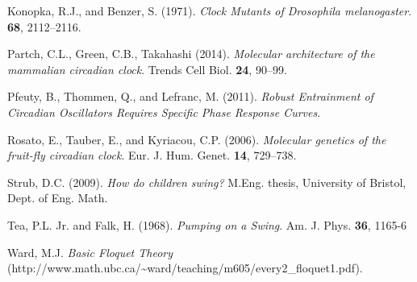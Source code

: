 \documentclass[11pt,letter, english,%
]{article}
\begin{document}
\bigskip\noindent
Konopka, R.J., and Benzer, S. (1971). \textit{Clock Mutants of Drosophila
melanogaster}. \textbf{68}, 2112–2116.

\bigskip\noindent
Partch, C.L., Green, C.B., Takahashi (2014).
\textit{Molecular architecture of the mammalian circadian clock}. Trends Cell
Biol. \textbf{24}, 90–99.

\bigskip\noindent
Pfeuty, B., Thommen, Q., and Lefranc, M. (2011). \textit{Robust Entrainment of
Circadian Oscillators Requires Specific Phase Response Curves}.

\bigskip\noindent
Rosato, E., Tauber, E., and Kyriacou, C.P. (2006). \textit{Molecular genetics
of the fruit-fly circadian clock}. Eur. J. Hum. Genet. \textbf{14},
729–738.

\bigskip\noindent
Strub, D.C. (2009). \textit{How do children swing?}  M.Eng. thesis, University
of Bristol, Dept. of Eng. Math.%

\bigskip\noindent
Tea, P.L. Jr. and Falk, H. (1968). \textit{Pumping on a Swing}. Am. J. Phys. 
\textbf{36}, 1165-6

\bigskip\noindent
Ward, M.J. \textit{Basic Floquet Theory}
(http://www.math.ubc.ca/\~{}ward/teaching/m605/every2\_floquet1.pdf).
\end{document}
